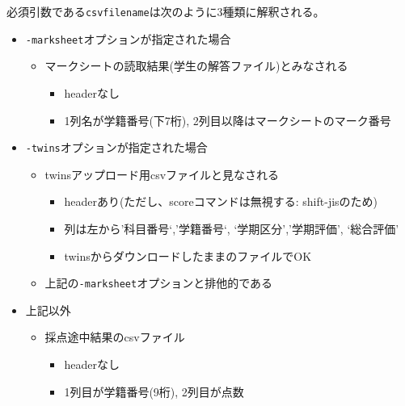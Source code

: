 必須引数である\texttt{csvfilename}は次のように3種類に解釈される。

\begin{itemize}
\item \texttt{-marksheet}オプションが指定された場合

\begin{itemize}
\item マークシートの読取結果(学生の解答ファイル)とみなされる

\begin{itemize}
\item headerなし

\item 1列名が学籍番号(下7桁), 2列目以降はマークシートのマーク番号

\end{itemize}

\end{itemize}

\item \texttt{-twins}オプションが指定された場合

\begin{itemize}
\item twinsアップロード用csvファイルと見なされる

\begin{itemize}
\item headerあり(ただし、scoreコマンドは無視する: shift-jisのため)

\item 列は左から'科目番号`,'学籍番号`, `学期区分','学期評価', `総合評価'

\item twinsからダウンロードしたままのファイルでOK

\end{itemize}

\item 上記の\texttt{-marksheet}オプションと排他的である

\end{itemize}

\item 上記以外

\begin{itemize}
\item 採点途中結果のcsvファイル

\begin{itemize}
\item headerなし

\item 1列目が学籍番号(9桁), 2列目が点数

\end{itemize}

\end{itemize}

\end{itemize}

